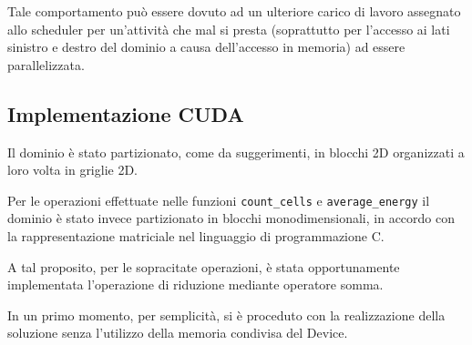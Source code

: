 Tale comportamento può essere dovuto ad un ulteriore carico di lavoro assegnato
allo scheduler per un'attività che mal si presta (soprattutto per l'accesso ai
lati sinistro e destro del dominio a causa dell'accesso in memoria) ad essere
parallelizzata.

\subsection{Implementazione CUDA}

Il dominio è stato partizionato, come da suggerimenti, in blocchi 2D organizzati
a loro volta in griglie 2D.

Per le operazioni effettuate nelle funzioni \texttt{count\_cells} e
\texttt{average\_energy} il dominio è stato invece partizionato in blocchi
monodimensionali, in accordo con la rappresentazione matriciale nel linguaggio
di programmazione C.

A tal proposito, per le sopracitate operazioni, è stata opportunamente
implementata l'operazione di riduzione mediante operatore somma.

In un primo momento, per semplicità, si è proceduto con la realizzazione della
soluzione senza l'utilizzo della memoria condivisa del Device.
